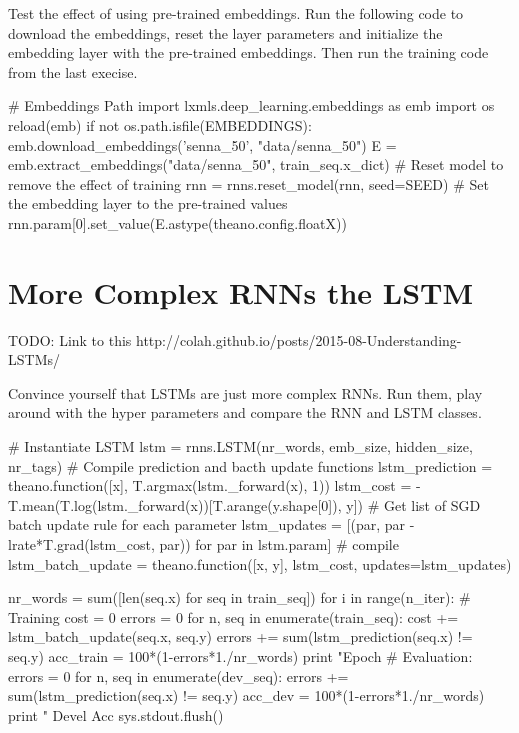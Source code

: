 \begin{exercise}
Test the effect of using pre-trained embeddings. Run the following code to
download the embeddings, reset the layer parameters and initialize the
embedding layer with the pre-trained embeddings. Then run the training code
from the last execise.
\begin{python}
# Embeddings Path
import lxmls.deep_learning.embeddings as emb
import os
reload(emb)
if not os.path.isfile(EMBEDDINGS):
    emb.download_embeddings('senna_50', "data/senna_50")
E = emb.extract_embeddings("data/senna_50", train_seq.x_dict) 
# Reset model to remove the effect of training
rnn = rnns.reset_model(rnn, seed=SEED)
# Set the embedding layer to the pre-trained values
rnn.param[0].set_value(E.astype(theano.config.floatX)) 
\end{python}
\end{exercise}


\section{More Complex RNNs the LSTM}

TODO: Link to this http://colah.github.io/posts/2015-08-Understanding-LSTMs/

\begin{exercise}
Convince yourself that LSTMs are just more complex RNNs. Run them, play around
with the hyper parameters and compare the RNN and LSTM classes.
\begin{python}
# Instantiate LSTM
lstm = rnns.LSTM(nr_words, emb_size, hidden_size, nr_tags)
# Compile prediction and bacth update functions
lstm_prediction = theano.function([x], T.argmax(lstm._forward(x), 1))
lstm_cost = -T.mean(T.log(lstm._forward(x))[T.arange(y.shape[0]), y])
# Get list of SGD batch update rule for each parameter
lstm_updates = [(par, par - lrate*T.grad(lstm_cost, par)) for par in lstm.param]
# compile
lstm_batch_update = theano.function([x, y], lstm_cost, updates=lstm_updates)
\end{python}

\begin{python}
nr_words = sum([len(seq.x) for seq in train_seq])
for i in range(n_iter):
    # Training
    cost = 0
    errors = 0
    for n, seq in enumerate(train_seq):
        cost += lstm_batch_update(seq.x, seq.y)
        errors += sum(lstm_prediction(seq.x) != seq.y)
    acc_train = 100*(1-errors*1./nr_words) 
    print "Epoch %
    # Evaluation:
    errors = 0
    for n, seq in enumerate(dev_seq):
        errors += sum(lstm_prediction(seq.x) != seq.y)  
    acc_dev = 100*(1-errors*1./nr_words) 
    print " Devel Acc %
    sys.stdout.flush()
\end{python}
\end{exercise}
